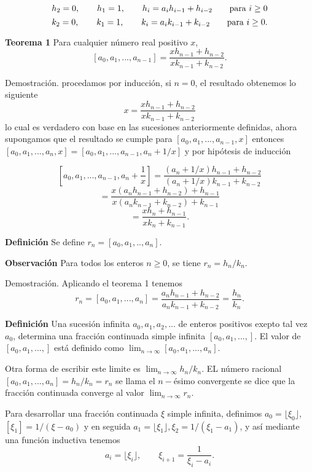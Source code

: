 \documentclass[11pt, article]{article}
\begin{document}
        \[
        h_2=0, \qquad h_1 =1, \qquad h_i=a_ih_{i-1} + h_{i-2} \qquad \textnormal{para } i\geq 0
        \]
        \[
        k_2=0, \qquad k_1 =1, \qquad k_i=a_ik_{i-1} + k_{i-2} \qquad \textnormal{para } i\geq 0.
        \]
    
    \textbf{Teorema 1} Para cualquier número real positivo $x$,
        \[
        [a_0,a_1,...,a_{n-1}]=\dfrac{xh_{n-1}+h_{n-2}}{xk_{n-1}+k_{n-2}}.
        \]
        
    Demostración. procedamos por inducción, si $n=0$, el resultado obtenemos lo siguiente
        \[
        x=\dfrac{xh_{n-1}+h_{n-2}}{xk_{n-1}+k_{n-2}}
        \]
        lo cual es verdadero con base en las sucesiones anteriormente definidas, ahora supongamos que el resultado se cumple para $[a_0,a_1,...,a_{n-1},x]$ entonces $[a_0,a_1,...,a_n,x]=[a_0,a_1,...,a_{n-1},a_n + 1/x]$ y por hipótesis de inducción
    
        \[
        [a_0,a_1,...,a_{n-1},a_n + \dfrac{1}{x}]
            =\dfrac{(a_n+1/x)h_{n-1}+h_{n-2}}{(a_n+1/x)k_{n-1}+k_{n-2}}
            \]
            \[
            =\dfrac{x(a_nh_{n-1}+h_{n-2})+h_{n-1}}{x(a_nk_{n-1}+k_{n-2})+k_{n-1}}
            \]
            \[
            =\dfrac{xh_n+h_{n-1}}{xk_n+k_{n-1}}.
        \]
        
    \textbf{Definición} Se define $r_n=[a_0,a_1,..,a_n]$.
    
    \textbf{Observación} Para todos los enteros $n \geq 0$, se tiene $r_n=h_n/k_n$.
    
    Demostración. Aplicando el teorema 1 tenemos
    \[
    r_n=[a_0,a_1,...,a_n]=\dfrac{a_nh_{n-1}+h_{n-2}}{a_nk_{n-1}+k_{n-2}}=\dfrac{h_n}{k_n}.
    \]
    
    \textbf{Definición}  Una sucesión infinita $a_0, a_1, a_2,...$ de enteros positivos exepto tal vez $a_0$, determina una fracción continuada simple infinita $[a_0, a_1, ..., ]$. El valor de $[a_0, a_1, ..., ]$ está definido como $\lim_{n\to\infty}[a_0, a_1, ..., a_n]$.
    
    Otra forma de escribir este limite es $\lim_{n\to\infty} h_n/k_n$. EL número racional $[a_0, a_1, ...,a_n]=h_n/k_n=r_n$ se llama el $n-$ésimo convergente se dice que la fracción continuada converge al valor $\lim_{n\to\infty}r_n$.
    
    Para desarrollar una fracción continuada $\xi$ simple infinita, definimos $a_0=\lfloor \xi_0 \rfloor$, $[\xi_1]=1/(\xi-a_0)$ y en seguida $a_1= \lfloor \xi_1 \rfloor, \xi_2=1/(\xi_1-a_1)$, y así mediante una función inductiva tenemos
        \begin{equation}
        a_i=\lfloor \xi_i \rfloor, \qquad \xi_{i+1}=\dfrac{1}{\xi_i-a_i}.
        \label{ecuacion_1}
        \end{equation}
\end{document}

